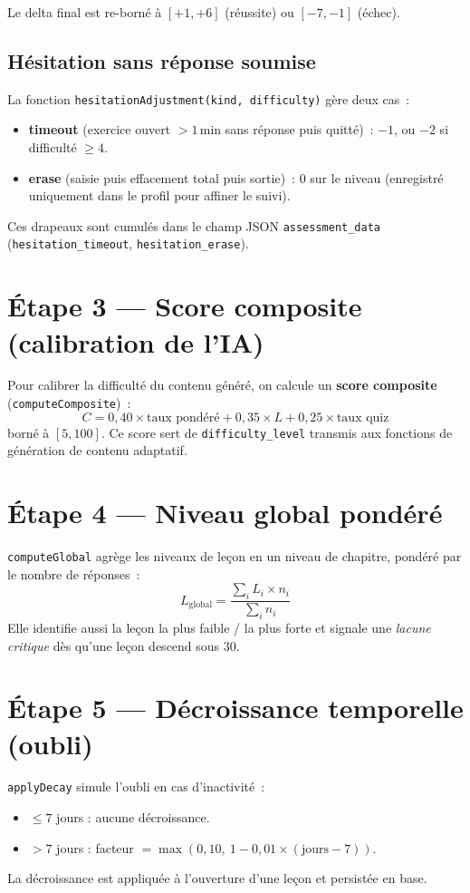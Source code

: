 Le delta final est re-borné à $[+1, +6]$ (réussite) ou $[-7, -1]$ (échec).

\subsection{Hésitation sans réponse soumise}
La fonction \texttt{hesitationAdjustment(kind, difficulty)} gère deux cas~:
\begin{itemize}
  \item \textbf{\og timeout\fg{}} (exercice ouvert $>1$\,min sans réponse puis quitté)~:
        $-1$, ou $-2$ si difficulté $\geq 4$.
  \item \textbf{\og erase\fg{}} (saisie puis effacement total puis sortie)~: $0$ sur le
        niveau (enregistré uniquement dans le profil pour affiner le suivi).
\end{itemize}
Ces drapeaux sont cumulés dans le champ JSON \texttt{assessment\_data}
(\texttt{hesitation\_timeout}, \texttt{hesitation\_erase}).

\section{Étape 3 --- Score composite (calibration de l'IA)}
Pour calibrer la difficulté du contenu généré, on calcule un \textbf{score
composite} (\texttt{computeComposite})~:
\[
C = 0{,}40 \times \text{taux pondéré} + 0{,}35 \times L + 0{,}25 \times \text{taux quiz}
\]
borné à $[5, 100]$. Ce score sert de \texttt{difficulty\_level} transmis aux
fonctions de génération de contenu adaptatif.

\section{Étape 4 --- Niveau global pondéré}
\texttt{computeGlobal} agrège les niveaux de leçon en un niveau de chapitre,
pondéré par le nombre de réponses~:
\[
L_{\text{global}} = \frac{\sum_i L_i \times n_i}{\sum_i n_i}
\]
Elle identifie aussi la leçon la plus faible / la plus forte et signale une
\emph{lacune critique} dès qu'une leçon descend sous 30.

\section{Étape 5 --- Décroissance temporelle (oubli)}
\texttt{applyDecay} simule l'oubli en cas d'inactivité~:
\begin{itemize}
  \item $\leq 7$ jours : aucune décroissance.
  \item $> 7$ jours : facteur $= \max(0{,}10,\ 1 - 0{,}01\times(\text{jours}-7))$.
\end{itemize}
La décroissance est appliquée à l'ouverture d'une leçon et persistée en base.

